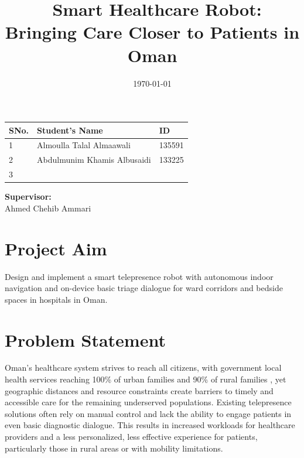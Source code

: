 \documentclass[11pt,a4paper]{article}
\title{\ Smart Healthcare Robot: Bringing Care Closer to Patients in Oman}
\author{} %
\date{\today}
\begin{document}
\maketitle

\vspace*{2cm} %

\begin{center}
\begin{tabular}{|l|l|l|}
\hline
\textbf{SNo.} & \textbf{Student's Name} & \textbf{ID} \\
\hline
1 & Almoulla Talal Almaawali& 135591\\\hline
2 & Abdulmunim Khamis Albusaidi& 133225\\\hline
3 & & \\
\hline
\end{tabular}
\end{center}

\vspace*{3cm} %

\begin{flushleft}
\textbf{Supervisor:} \\
Ahmed Chehib Ammari
\end{flushleft}

\vfill %
\newpage %

\section{Project Aim}
Design and implement a smart telepresence robot with autonomous indoor navigation and on-device basic triage dialogue for ward corridors and bedside spaces in hospitals in Oman.


\section{Problem Statement}

Oman's healthcare system strives to reach all citizens, with government local health services reaching 100\% of urban families and 90\% of rural families \cite{alsheikhly2006}, yet geographic distances and resource constraints create barriers to timely and accessible care for the remaining underserved populations. Existing telepresence solutions often rely on manual control and lack the ability to engage patients in even basic diagnostic dialogue. This results in increased workloads for healthcare providers and a less personalized, less effective experience for patients, particularly those in rural areas or with mobility limitations.
\end{document}
